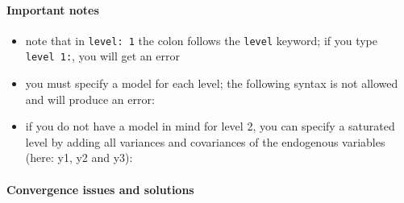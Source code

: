 \hypertarget{important-notes}{%
\paragraph{Important notes}\label{important-notes}}

\begin{itemize}
\item
  note that in \texttt{level:\ 1} the colon follows the \texttt{level}
  keyword; if you type \texttt{level\ 1:}, you will get an error
\item
  you must specify a model for each level; the following syntax is not
  allowed and will produce an error:

\begin{Shaded}
\begin{Highlighting}[]
\OtherTok{\textless{}{-}} \StringTok{\textquotesingle{}}
\StringTok{\textquotesingle{}}
\end{Highlighting}
\end{Shaded}
\item
  if you do not have a model in mind for level 2, you can specify a
  saturated level by adding all variances and covariances of the
  endogenous variables (here: y1, y2 and y3):

\begin{Shaded}
\begin{Highlighting}[]
\OtherTok{\textless{}{-}} \StringTok{\textquotesingle{}}
\StringTok{\textquotesingle{}}
\end{Highlighting}
\end{Shaded}
\end{itemize}

\hypertarget{convergence-issues-and-solutions}{%
\paragraph{Convergence issues and
solutions}\label{convergence-issues-and-solutions}}

